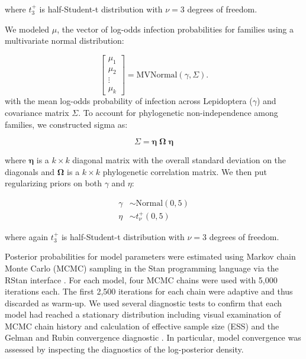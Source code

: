 \documentclass{frontiersSCNS} %
\begin{document}
where $t_{3}^{+}$ is half-Student-t distribution with $\nu=3$ degrees of freedom. 

We modeled $\mu$, the vector of log-odds infection probabilities for families using a multivariate normal distribution:

\begin{equation}
	\begin{bmatrix}
		\mu_{1} \\
        \mu_{2} \\
        \vdots \\
        \mu_{k}
	\end{bmatrix}
    = 
    \textrm{MVNormal}(\gamma, \Sigma).
\end{equation}
with the mean log-odds probability of infection across Lepidoptera ($\gamma$) and covariance matrix $\Sigma$. To account for phylogenetic non-independence among families, we constructed sigma as:

\begin{equation}
	\Sigma = \boldsymbol{\eta} \;	\boldsymbol{\Omega} \; \boldsymbol{\eta}
\end{equation}

where $\boldsymbol{\eta}$ is a $k \times k$ diagonal matrix with the overall standard deviation on the diagonals and $\boldsymbol{\Omega}$ is a $k \times k$ phylogenetic correlation matrix. We then put regularizing priors on both $\gamma$ and $\eta$:

\begin{align}
	\gamma 	&\sim \mathrm{Normal}(0, 5) \nonumber \\
	\eta   	&\sim t_{\nu}^{+}(0,5)
\end{align}

where again $t_{3}^{+}$ is half-Student-t distribution with $\nu=3$ degrees of freedom. 

Posterior probabilities for model parameters were estimated using Markov chain Monte Carlo (MCMC) sampling in the Stan programming language \citep{Carpenter:2016aa} via the RStan interface \citep{stan:2016aa}. For each model, four MCMC chains were used with 5,000 iterations each. The first 2,500 iterations for each chain were adaptive and thus discarded as warm-up. We used several diagnostic tests to confirm that each model had reached a stationary distribution including visual examination of MCMC chain history and calculation of effective sample size (ESS) and the Gelman and Rubin convergence diagnostic \citep{Gelman:1992aa,Brooks:1998aa}. In particular, model convergence was assessed by inspecting the diagnostics of the log-posterior density. 
\end{document}
